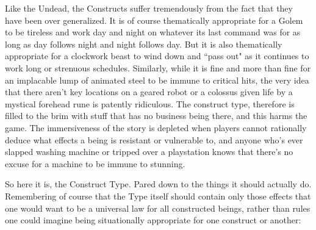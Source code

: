 Like the Undead, the Constructs suffer tremendously from the fact that they have been over generalized. It is of course thematically appropriate for a Golem to be tireless and work day and night on whatever its last command was for as long as day follows night and night follows day. But it is also thematically appropriate for a clockwork beast to wind down and ``pass out" as it continues to work long or strenuous schedules. Similarly, while it is fine and more than fine for an implacable lump of animated steel to be immune to critical hits, the very idea that there aren't key locations on a geared robot or a colossus given life by a mystical forehead rune is patently ridiculous. The construct type, therefore is filled to the brim with stuff that has no business being there, and this harms the game. The immersiveness of the story is depleted when players cannot rationally deduce what effects a being is resistant or vulnerable to, and anyone who's ever slapped washing machine or tripped over a playstation knows that there's no excuse for a machine to be immune to stunning.

So here it is, the Construct Type. Pared down to the things it should actually do. Remembering of course that the Type itself should contain only those effects that one would want to be a universal law for all constructed beings, rather than rules one could imagine being situationally appropriate for one construct or another:

